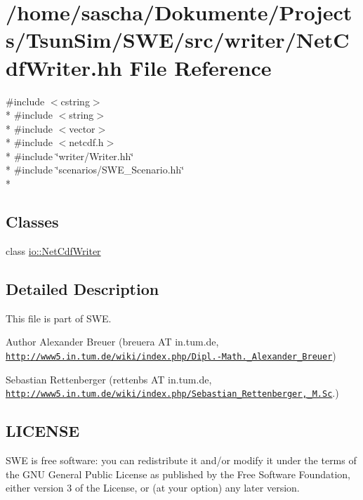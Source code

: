 \hypertarget{NetCdfWriter_8hh}{\section{/home/sascha/\-Dokumente/\-Projects/\-Tsun\-Sim/\-S\-W\-E/src/writer/\-Net\-Cdf\-Writer.hh File Reference}
\label{NetCdfWriter_8hh}
}
{\ttfamily \#include $<$cstring$>$}\\*
{\ttfamily \#include $<$string$>$}\\*
{\ttfamily \#include $<$vector$>$}\\*
{\ttfamily \#include $<$netcdf.\-h$>$}\\*
{\ttfamily \#include \char`\"{}writer/\-Writer.\-hh\char`\"{}}\\*
{\ttfamily \#include \char`\"{}scenarios/\-S\-W\-E\-\_\-\-Scenario.\-hh\char`\"{}}\\*
\subsection*{Classes}
\begin{DoxyCompactItemize}
\item 
class \hyperlink{classio_1_1NetCdfWriter}{io\-::\-Net\-Cdf\-Writer}
\end{DoxyCompactItemize}


\subsection{Detailed Description}
This file is part of S\-W\-E.

\begin{DoxyAuthor}{Author}
Alexander Breuer (breuera A\-T in.\-tum.\-de, \href{http://www5.in.tum.de/wiki/index.php/Dipl.-Math._Alexander_Breuer}{\tt http\-://www5.\-in.\-tum.\-de/wiki/index.\-php/\-Dipl.-\/\-Math.\-\_\-\-Alexander\-\_\-\-Breuer}) 

Sebastian Rettenberger (rettenbs A\-T in.\-tum.\-de, \href{http://www5.in.tum.de/wiki/index.php/Sebastian_Rettenberger,_M.Sc}{\tt http\-://www5.\-in.\-tum.\-de/wiki/index.\-php/\-Sebastian\-\_\-\-Rettenberger,\-\_\-\-M.\-Sc}.)
\end{DoxyAuthor}
\hypertarget{Writer_8hh_LICENSE}{}\subsection{L\-I\-C\-E\-N\-S\-E}\label{Writer_8hh_LICENSE}
S\-W\-E is free software\-: you can redistribute it and/or modify it under the terms of the G\-N\-U General Public License as published by the Free Software Foundation, either version 3 of the License, or (at your option) any later version.


